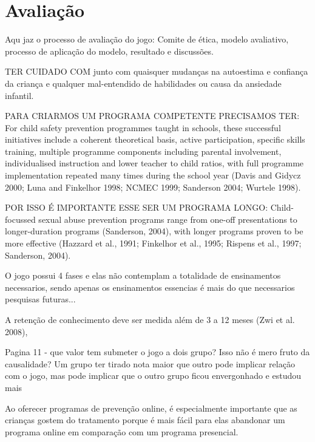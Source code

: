 \chapter{Avaliação}\label{ch:Avaliacao}

Aqu jaz o processo de avaliação do jogo:
Comite de ética, modelo avaliativo, processo de aplicação do modelo, resultado e discussões. 


TER CUIDADO COM junto com quaisquer mudanças na autoestima e confiança da criança e qualquer mal-entendido de habilidades ou causa da ansiedade infantil.


PARA CRIARMOS UM PROGRAMA COMPETENTE PRECISAMOS TER: For child safety prevention programmes taught in schools, these successful initiatives include a coherent theoretical basis, active participation, specific skills training, multiple programme components including parental involvement, individualised instruction and lower teacher to child ratios, with full programme implementation repeated many times during the school year (Davis and Gidycz 2000; Luna and Finkelhor 1998; NCMEC 1999; Sanderson 2004; Wurtele 1998).

POR ISSO É IMPORTANTE ESSE SER UM PROGRAMA LONGO: Child-focussed sexual abuse prevention programs range from one-off presentations to longer-duration programs (Sanderson, 2004), with longer programs proven to be more effective (Hazzard et al., 1991; Finkelhor et al., 1995; Rispens et al., 1997; Sanderson, 2004). %




O jogo possui 4 fases e elas não contemplam a totalidade de ensinamentos necessarios, sendo apenas os ensinamentos essencias é mais do que necessarios pesquisas futuras... 


A retenção de conhecimento deve ser medida além de 3 a 12 meses (Zwi et al. 2008),

Pagina 11 - que valor tem submeter o jogo a dois grupo? Isso não é mero fruto da causalidade? Um grupo ter tirado nota maior que outro pode implicar relação com o jogo, mas pode implicar que o outro grupo ficou envergonhado e estudou mais\cite{wazlawick2014metodologia}


Ao oferecer programas de prevenção online, é especialmente importante que as crianças gostem do tratamento porque é mais fácil para elas abandonar um programa online em comparação com um programa presencial. \cite{muller2014child}